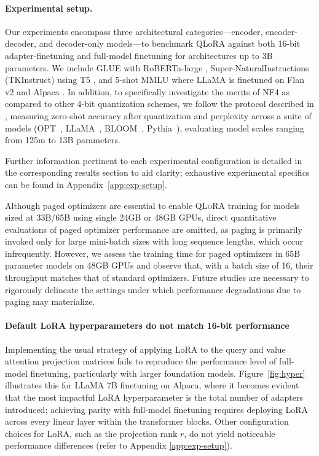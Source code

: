 \paragraph{Experimental setup.} Our experiments encompass three architectural categories—encoder, encoder-decoder, and decoder-only models—to benchmark QLoRA against both 16-bit adapter-finetuning and full-model finetuning for architectures up to 3B parameters. We include GLUE \citep{wang2018glue} with RoBERTa-large \citep{liu2019roberta}, Super-NaturalInstructions (TKInstruct) \citep{wang2022super} using T5 \citep{t5}, and 5-shot MMLU \citep{hendrycksmeasuring} where LLaMA is finetuned on Flan v2 \citep{longpre2023flan} and Alpaca \citep{alpaca}. In addition, to specifically investigate the merits of NF4 as compared to other 4-bit quantization schemes, we follow the protocol described in \citet{dettmers2022case}, measuring zero-shot accuracy after quantization and perplexity across a suite of models (OPT~\citep{zhang2022opt}, LLaMA~\citep{touvron2023llama}, BLOOM~\citep{scao2022bloom}, Pythia~\citep{biderman2023pythia}), evaluating model scales ranging from 125m to 13B parameters.

Further information pertinent to each experimental configuration is detailed in the corresponding results section to aid clarity; exhaustive experimental specifics can be found in Appendix~\ref{app:exp-setup}.

Although paged optimizers are essential to enable \textsc{QLoRA} training for models sized at 33B/65B using single 24GB or 48GB GPUs, direct quantitative evaluations of paged optimizer performance are omitted, as paging is primarily invoked only for large mini-batch sizes with long sequence lengths, which occur infrequently. However, we assess the training time for paged optimizers in 65B parameter models on 48GB GPUs and observe that, with a batch size of 16, their throughput matches that of standard optimizers. Future studies are necessary to rigorously delineate the settings under which performance degradations due to paging may materialize.

\paragraph{Default LoRA hyperparameters do not match 16-bit performance} 

Implementing the usual strategy of applying LoRA to the query and value attention projection matrices \citep{hu2021lora} fails to reproduce the performance level of full-model finetuning, particularly with larger foundation models. Figure~\ref{fig:hyper} illustrates this for LLaMA 7B finetuning on Alpaca, where it becomes evident that the most impactful LoRA hyperparameter is the total number of adapters introduced; achieving parity with full-model finetuning requires deploying LoRA across every linear layer within the transformer blocks. Other configuration choices for LoRA, such as the projection rank $r$, do not yield noticeable performance differences (refer to Appendix \ref{app:exp-setup}).

